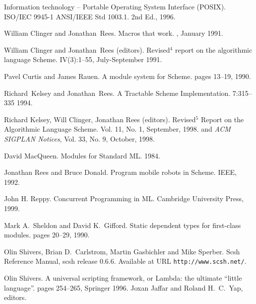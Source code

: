 
\begin{thebibliography}{10}
\addtocounter{chapter}{1}

Information technology -- Portable Operating System Interface (POSIX).
\newblock ISO/IEC 9945-1 ANSI/IEEE Std 1003.1.
\newblock 2nd Ed., 1996.

William Clinger and Jonathan~Rees.
\newblock Macros that work.
, January 1991.

William Clinger and Jonathan~Rees (editors).
\newblock Revised${}^4$ report on the algorithmic language {S}cheme.
 IV(3):1--55, July-September 1991.

Pavel Curtis and James Rauen.
\newblock A module system for Scheme.
pages 13--19, 1990.

Richard~Kelsey and Jonathan~Rees.
\newblock A Tractable {Scheme} Implementation.
 7:315--335 1994.

Richard Kelsey, Will Clinger, Jonathan Rees (editors).
\newblock Revised$^5$ Report on the Algorithmic Language Scheme.
 Vol. 11, No. 1,
 September, 1998.
\newblock and {\em ACM SIGPLAN Notices}, Vol. 33, No. 9, October, 1998.

David MacQueen.
\newblock Modules for Standard ML.
1984.

Jonathan Rees and Bruce Donald.
\newblock Program mobile robots in Scheme.
 IEEE, 1992. 

John H. Reppy.
\newblock Concurrent Programming in ML.
\newblock Cambridge University Press, 1999.

Mark A.~Sheldon and David K.~Gifford.
\newblock Static dependent types for first-class modules.
pages 20--29, 1990.

Olin Shivers, Brian D.~Carlstrom, Martin Gasbichler and Mike Sperber.
\newblock Scsh Reference Manual, scsh release 0.6.6.
\newblock Available at URL \texttt{http://www.scsh.net/}.

Olin Shivers.
\newblock A universal scripting framework, 
 or Lambda: the ultimate ``little language''.
 pages 254--265, Springer 1996.
\newblock Joxan Jaffar and Roland H.~C.~Yap, editors.

\end{thebibliography}
